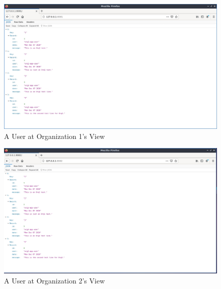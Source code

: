 			\begin{figure}[H]
		\includegraphics[width=.9\textwidth]{./fabsec-report-network-flow/network-flow-21.jpg}
		\caption{A User at Organization 1's View}
		\end{figure}	
		
		\begin{figure}[H]
		\includegraphics[width=.9\textwidth]{./fabsec-report-network-flow/network-flow-22.jpg}
		\caption{A User at Organization 2's View}
		\end{figure}	
		